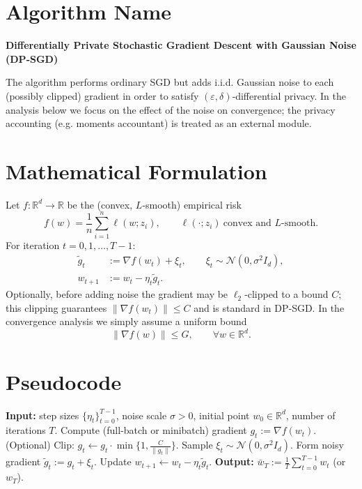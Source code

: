 \documentclass{article}
\newcommand{\R}{\mathbb{R}}
\begin{document}
\section*{Algorithm Name}
\textbf{Differentially Private Stochastic Gradient Descent with Gaussian Noise (DP‑SGD)}  

The algorithm performs ordinary SGD but adds i.i.d. Gaussian noise to each (possibly clipped) gradient in order to satisfy $(\varepsilon,\delta)$‑differential privacy.  In the analysis below we focus on the effect of the noise on convergence; the privacy accounting (e.g. moments accountant) is treated as an external module.

\section*{Mathematical Formulation}
Let $f:\R^{d}\to\R$ be the (convex, $L$‑smooth) empirical risk
\[
f(w)=\frac1n\sum_{i=1}^{n}\ell(w;z_i),\qquad 
\ell(\cdot;z_i)\ \text{convex and $L$‑smooth}.
\]
For iteration $t=0,1,\dots,T-1$:
\begin{align}
\tilde g_t &:= \nabla f(w_t) + \xi_t, \qquad 
\xi_t\sim\mathcal N(0,\sigma^2 I_d), \label{eq:update}\\
w_{t+1} &:= w_t - \eta_t \tilde g_t . \label{eq:update2}
\end{align}
Optionally, before adding noise the gradient may be $\ell_2$‑clipped to a bound $C$; this clipping guarantees $\|\nabla f(w_t)\|\le C$ and is standard in DP‑SGD.  In the convergence analysis we simply assume a uniform bound
\[
\|\nabla f(w)\|\le G,\qquad\forall w\in\R^{d}. \tag{A1}
\]

\section*{Pseudocode}
\begin{algorithm}[H]
\caption{DP‑SGD with Gaussian noise}
\begin{algorithmic}[1]
\STATE \textbf{Input:} step sizes $\{\eta_t\}_{t=0}^{T-1}$, noise scale $\sigma>0$, initial point $w_0\in\R^{d}$, number of iterations $T$.
    \STATE Compute (full‑batch or minibatch) gradient $g_t:=\nabla f(w_t)$.
    \STATE (Optional) Clip: $g_t\leftarrow g_t\cdot\min\!\Big\{1,\frac{C}{\|g_t\|}\Big\}$.
    \STATE Sample $\xi_t\sim\mathcal N(0,\sigma^2 I_d)$.
    \STATE Form noisy gradient $\tilde g_t:= g_t+\xi_t$.
    \STATE Update $w_{t+1}\gets w_t-\eta_t \tilde g_t$.
\ENDFOR
\STATE \textbf{Output:} $\bar w_T:=\frac1T\sum_{t=0}^{T-1} w_t$ (or $w_T$).
\end{algorithmic}
\end{algorithm}
\end{document}
